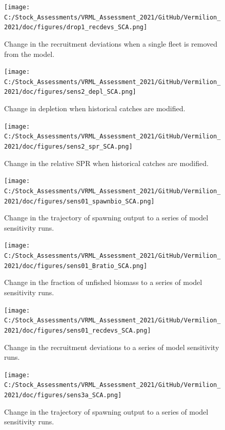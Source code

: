 \documentclass[11pt,
  english,
]{article}
\begin{document}
\begin{figure}
\centering
\texttt{[image: C:/Stock\_Assessments/VRML\_Assessment\_2021/GitHub/Vermilion\_2021/doc/figures/drop1\_recdevs\_SCA.png]}
\caption{Change in the recruitment deviations when a single fleet is removed from the model.\label{fig:drop-recdev}}
\end{figure}

\FloatBarrier

\begin{figure}
\centering
\texttt{[image: C:/Stock\_Assessments/VRML\_Assessment\_2021/GitHub/Vermilion\_2021/doc/figures/sens2\_depl\_SCA.png]}
\caption{Change in depletion when historical catches are modified.\label{fig:sens2-depl}}
\end{figure}

\begin{figure}
\centering
\texttt{[image: C:/Stock\_Assessments/VRML\_Assessment\_2021/GitHub/Vermilion\_2021/doc/figures/sens2\_spr\_SCA.png]}
\caption{Change in the relative SPR when historical catches are modified.\label{fig:sens2-spr}}
\end{figure}

\FloatBarrier

\begin{figure}
\centering
\texttt{[image: C:/Stock\_Assessments/VRML\_Assessment\_2021/GitHub/Vermilion\_2021/doc/figures/sens01\_spawnbio\_SCA.png]}
\caption{Change in the trajectory of spawning output to a series of model sensitivity runs.\label{fig:sens1-spawnb}}
\end{figure}

\begin{figure}
\centering
\texttt{[image: C:/Stock\_Assessments/VRML\_Assessment\_2021/GitHub/Vermilion\_2021/doc/figures/sens01\_Bratio\_SCA.png]}
\caption{Change in the fraction of unfished biomass to a series of model sensitivity runs.\label{fig:sens1-bratio}}
\end{figure}

\begin{figure}
\centering
\texttt{[image: C:/Stock\_Assessments/VRML\_Assessment\_2021/GitHub/Vermilion\_2021/doc/figures/sens01\_recdevs\_SCA.png]}
\caption{Change in the recruitment deviations to a series of model sensitivity runs.\label{fig:sens1-recdevs}}
\end{figure}

\FloatBarrier

\begin{figure}
\centering
\texttt{[image: C:/Stock\_Assessments/VRML\_Assessment\_2021/GitHub/Vermilion\_2021/doc/figures/sens3a\_SCA.png]}
\caption{Change in the trajectory of spawning output to a series of model sensitivity runs.\label{fig:sens3a}}
\end{figure}
\end{document}
